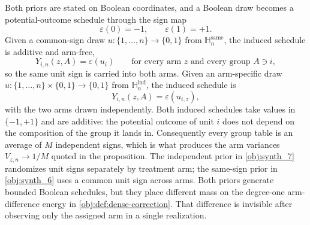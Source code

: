 \documentclass[11pt]{article}
\begin{document}
Both priors are stated on Boolean coordinates, and a Boolean draw becomes a potential-outcome schedule through the sign map
\[
\varepsilon(0)=-1,\qquad \varepsilon(1)=+1 .
\]
Given a common-sign draw \(u:\{1,\ldots,n\}\to\{0,1\}\) from \(\mathbb H_n^{\mathrm{same}}\), the induced schedule is additive and arm-free,
\[
Y_{i,n}(z,A)=\varepsilon(u_i)\qquad\text{for every arm }z\text{ and every group }A\ni i,
\]
so the same unit sign is carried into both arms. Given an arm-specific draw \(u:\{1,\ldots,n\}\times\{0,1\}\to\{0,1\}\) from \(\mathbb H_n^{\mathrm{ind}}\), the induced schedule is
\[
Y_{i,n}(z,A)=\varepsilon(u_{i,z}),
\]
with the two arms drawn independently. Both induced schedules take values in \(\{-1,+1\}\) and are additive: the potential outcome of unit \(i\) does not depend on the composition of the group it lands in. Consequently every group table is an average of \(M\) independent signs, which is what produces the arm variances \(V_{z,n}\to1/M\) quoted in the proposition. The independent prior in \cref{obj:synth_7} randomizes unit signs separately by treatment arm; the same-sign prior in \cref{obj:synth_6} uses a common unit sign across arms. Both priors generate bounded Boolean schedules, but they place different mass on the degree-one arm-difference energy in \cref{obj:def:dense-correction}. That difference is invisible after observing only the assigned arm in a single realization.
\end{document}
